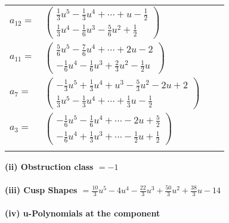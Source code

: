 \documentclass[1p]{elsarticle_modified}
\theoremstyle{definition}
\begin{document}
\begin{tabular}{m{7pt} m{180pt} m{7pt} m{180pt} }
\flushright $a_{12}=$&$\begin{pmatrix}\frac{1}{3} u^5-\frac{1}{3} u^4+\cdots+u-\frac{1}{2}\\\frac{1}{3} u^4-\frac{1}{6} u^3-\frac{5}{6} u^2+\frac{1}{2}\end{pmatrix}$ \\
\flushright $a_{11}=$&$\begin{pmatrix}\frac{5}{6} u^5-\frac{7}{6} u^4+\cdots+2 u-2\\-\frac{1}{6} u^4-\frac{1}{6} u^3+\frac{2}{3} u^2-\frac{1}{2} u\end{pmatrix}$ \\
\flushright $a_{7}=$&$\begin{pmatrix}-\frac{1}{3} u^5+\frac{1}{3} u^4+u^3-\frac{5}{3} u^2-2 u+2\\\frac{1}{3} u^5-\frac{1}{3} u^4+\cdots+\frac{1}{3} u-\frac{1}{2}\end{pmatrix}$ \\
\flushright $a_{3}=$&$\begin{pmatrix}-\frac{1}{6} u^5-\frac{1}{6} u^4+\cdots-2 u+\frac{5}{2}\\-\frac{1}{6} u^4+\frac{1}{3} u^3+\cdots-\frac{1}{2} u+\frac{1}{2}\end{pmatrix}$\\&\end{tabular}
\flushleft \textbf{(ii) Obstruction class $= -1$}\\~\\
\flushleft \textbf{(iii) Cusp Shapes $= \frac{10}{3} u^5-4 u^4-\frac{22}{3} u^3+\frac{50}{3} u^2+\frac{38}{3} u-14$}\\~\\
\newpage\renewcommand{\arraystretch}{1}
\flushleft \textbf{(iv) u-Polynomials at the component}\newline \\
\end{document}
